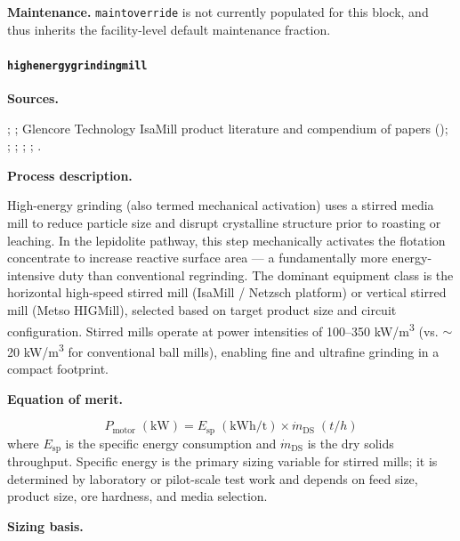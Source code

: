 \documentclass{article}
\renewcommand\_{\textunderscore\allowbreak}
\begin{document}
\medskip
\noindent\textbf{Maintenance.}\quad
\texttt{maint\_override} is not currently populated for this block, and thus inherits the facility-level default maintenance fraction.

\clearpage
\paragraph{\texttt{high\_energy\_grinding\_mill}}\label{app:04-methods-blockdefs-hegm}\leavevmode\par

\medskip
\noindent\textbf{Sources.}\quad

\citet{debakkerEnergyUseFine2014}; \citet{brissetteEnergySavingsTechnology2010}; Glencore Technology IsaMill product literature and compendium of papers (\citet{glencoretechnologyIsaMill2020Compendium2020}); \citet{kumarEnergyEfficientAdvancedUltrafine2023}; \citet{nanMethodsExtractingLithium2019}; \citet{nanMethodsExtractingLithium2022}; \citet{zouMethodEfficientLithium2024}; 
\citet{ulrichGuideChemicalEngineering1984}.

\medskip
\noindent\textbf{Process description.}\quad

High-energy grinding (also termed mechanical activation) uses a stirred media mill to reduce particle size and disrupt crystalline structure prior to roasting or leaching. In the lepidolite pathway, this step mechanically activates the flotation concentrate to increase reactive surface area --- a fundamentally more energy-intensive duty than conventional regrinding. The dominant equipment class is the horizontal high-speed stirred mill (IsaMill / Netzsch platform) or vertical stirred mill (Metso HIGMill), selected based on target product size and circuit configuration. Stirred mills operate at power intensities of 100--350 \si{kW/m^3} (vs. $\sim$20 \si{kW/m^3} for conventional ball mills), enabling fine and ultrafine grinding in a compact footprint.


\medskip
\noindent\textbf{Equation of merit.}\quad

\[
	P_{\text{motor}}\;(\text{kW}) = E_{\text{sp}}\;(\text{kWh/t}) \times \dot{m}_{\text{DS}}\;(\si{t/h})
\]
where $E_{\text{sp}}$ is the specific energy consumption and $\dot{m}_{\text{DS}}$ is the dry solids throughput. Specific energy is the primary sizing variable for stirred mills; it is determined by laboratory or pilot-scale test work and depends on feed size, product size, ore hardness, and media selection.


\medskip
\noindent\textbf{Sizing basis.}\quad
\end{document}
